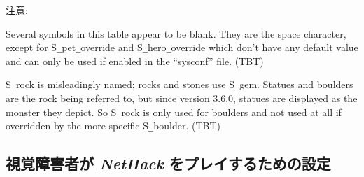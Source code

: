 注意:

Several symbols in this table appear to be blank.
They are the space character, except for S\verb+_+pet\verb+_+override
and S\verb+_+hero\verb+_+override which don't have any default value
and can only be used if enabled in the ``sysconf'' file.
(TBT)

S\verb+_+rock is misleadingly named; rocks and stones use S\verb+_+gem.
Statues and boulders are the rock being referred to, but since
version 3.6.0, statues are displayed as the monster they depict.
So S\verb+_+rock is only used for boulders and not used at all if
overridden by the more specific S\verb+_+boulder.
(TBT)

\subsection*{視覚障害者が {\it NetHack\/} をプレイするための設定}


